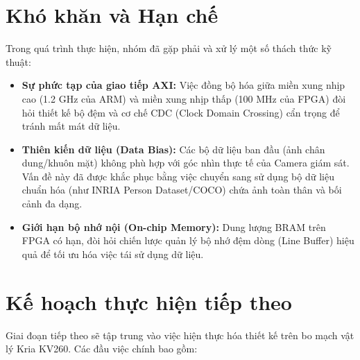 \section{Khó khăn và Hạn chế}
Trong quá trình thực hiện, nhóm đã gặp phải và xử lý một số thách thức kỹ thuật:

\begin{itemize}
    \item \textbf{Sự phức tạp của giao tiếp AXI:} Việc đồng bộ hóa giữa miền xung nhịp cao (1.2 GHz của ARM) và miền xung nhịp thấp (100 MHz của FPGA) đòi hỏi thiết kế bộ đệm và cơ chế CDC (Clock Domain Crossing) cẩn trọng để tránh mất mát dữ liệu.
    \item \textbf{Thiên kiến dữ liệu (Data Bias):} Các bộ dữ liệu ban đầu (ảnh chân dung/khuôn mặt) không phù hợp với góc nhìn thực tế của Camera giám sát. Vấn đề này đã được khắc phục bằng việc chuyển sang sử dụng bộ dữ liệu chuẩn hóa (như INRIA Person Dataset/COCO) chứa ảnh toàn thân và bối cảnh đa dạng.
    \item \textbf{Giới hạn bộ nhớ nội (On-chip Memory):} Dung lượng BRAM trên FPGA có hạn, đòi hỏi chiến lược quản lý bộ nhớ đệm dòng (Line Buffer) hiệu quả để tối ưu hóa việc tái sử dụng dữ liệu.
\end{itemize}

\newpage
\section{Kế hoạch thực hiện tiếp theo}
Giai đoạn tiếp theo sẽ tập trung vào việc hiện thực hóa thiết kế trên bo mạch vật lý Kria KV260. Các đầu việc chính bao gồm:

